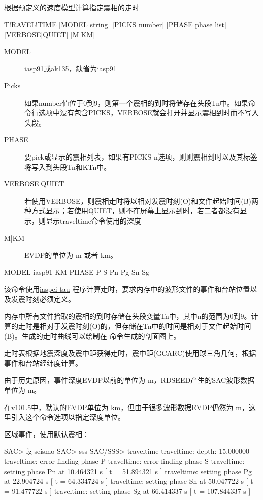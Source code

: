 \label{sss:traveltime}

根据预定义的速度模型计算指定震相的走时

\begin{SACSTX}
T!RAVEL!TIME [MODEL string] [PICKS number] [PHASE phase list]
    [VERBOSE|QUIET] [M|KM]
\end{SACSTX}

\begin{description}
\item [MODEL] iasp91或ak135，缺省为iasp91
\item [Picks] 如果number值位于0到9，则第一个震相的到时将储存在头段Tn中。如果命令行选项中没有包含PICKS，VERBOSE就会打开并显示震相到时而不写入头段。
\item [PHASE] 要pick或显示的震相列表，如果有PICKS n选项，则则震相到时以及其标签将写入到头段Tn和KTn中。
\item [VERBOSE|QUIET] 若使用VERBOSE，则震相走时将以相对发震时刻(O)和文件起始时间(B)两种方式显示；若使用QUIET，则不在屏幕上显示到时，若二者都没有显示，则显示traveltime命令使用的深度
\item [M|KM] EVDP的单位为 \si{\m} 或者 \si{\km}。
\end{description}

\begin{SACDFT}
MODEL iasp91 KM PHASE P S Pn Pg Sn Sg
\end{SACDFT}

该命令使用\href{http://www.iris.edu/software/downloads/processing/}{iaspei-tau}
程序计算走时，要求内存中的波形文件的事件和台站位置以及发震时刻必须定义。

内存中所有文件拾取的震相的到时存储在头段变量Tn中，其中n的范围为0到9。计算的走时是相对于发震时刻(O)的，但存储在Tn中的时间是相对于文件起始时间(B)。生成的走时曲线可以绘制在  命令生成的剖面图上。

走时表根据地震深度及震中距获得走时，震中距(GCARC)使用球三角几何，根据事件和台站经纬度计算。

由于历史原因，事件深度EVDP以前的单位为 \si{\m}，RDSEED产生的SAC波形数据单位为 \si{\m}。

在v101.5中，默认的EVDP单位为 \si{\km}，但由于很多波形数据EVDP仍然为 \si{\m}，这里引入这个命令选项以指定深度单位。

区域事件，使用默认震相：
\begin{SACCode}
SAC> fg seismo
SAC> sss
SAC/SSS> traveltime
traveltime: depth: 15.000000
traveltime: error finding phase P
traveltime: error finding phase S
traveltime: setting phase Pn       at 10.464321 s [ t = 51.894321 s ]
traveltime: setting phase Pg       at 22.904724 s [ t = 64.334724 s ]
traveltime: setting phase Sn       at 50.047722 s [ t = 91.477722 s ]
traveltime: setting phase Sg      at 66.414337 s [ t = 107.844337 s ]
\end{SACCode}


